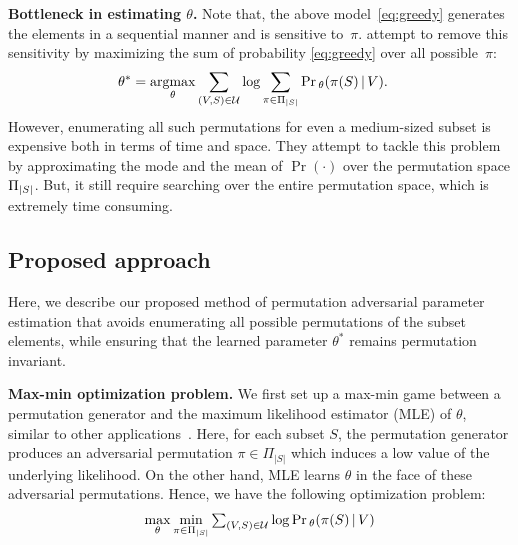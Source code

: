 \documentclass{article}
\newcommand{\xhdr}[1]{\noindent\textbf{#1.}}
\DeclareMathOperator*{\argmax}{argmax}
\renewcommand{\cite}{\citep}
\begin{document}
\xhdr{Bottleneck in estimating $\theta$}  Note that, the above model~\eqref{eq:greedy} generates the elements in a sequential manner and is sensitive to~$\pi$.
\citet{tschiatschek2018differentiable} attempt to remove this sensitivity by maximizing the sum of probability \eqref{eq:greedy} over all possible~$\pi$:
\begin{align}
\theta^* &=
\argmax_{\theta}\sum_{(V,\St)\in\Ucal} 
\log \sum_{\pi\in \Pi_{|\St|}} \Pr{}_\theta (\pi(S) \given V).  \label{eq:sumperm}
\end{align}
However, enumerating all such permutations for even a medium-sized subset is expensive both in terms of time and space. They attempt to tackle this problem by approximating the mode and the mean of $\Pr (\cdot)$ over the permutation space $\Pi_{|S|}$. But, it still require searching over the entire permutation space, which is extremely time consuming.

\subsection{Proposed approach}
Here, we describe our proposed method of permutation adversarial parameter estimation that avoids enumerating all possible permutations of the subset elements, 
while ensuring that the learned parameter $\theta^*$ remains permutation invariant. 

\xhdr{Max-min optimization problem} We first set up a max-min game between a permutation generator and
the maximum likelihood estimator (MLE) of $\theta$, similar to other applications~\cite{permgnn,prateek}.  Here, for each subset $S$, the permutation generator produces an adversarial permutation $\pi \in \Pi_{|S|}$
which induces a low value of the underlying likelihood. On the other hand,  MLE learns $\theta$ in the face of these adversarial permutations. Hence, we have the following optimization problem:
\begin{align}
 \max_{\theta} \min_{\pi \in \Pi_{|S|}} \textstyle \sum_{(V,S)\in \mathcal{U}}
 \log \mathop{\mathrm{Pr}}{}_\theta (\pi(S) \,|\, V) \label{eq:hard-maxmin}  
\end{align}
\end{document}
